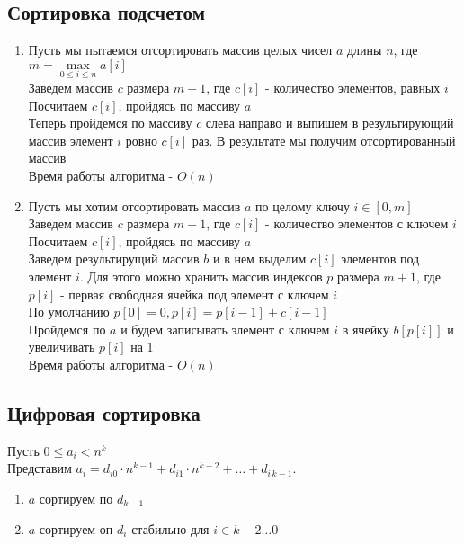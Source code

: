 \documentclass[12pt]{article}
\begin{document}
\subsection{Сортировка подсчетом}
\begin{enumerate}
    \item Пусть мы пытаемся отсортировать массив целых чисел $a$ длины $n$, где $m=\max\limits_{0\leq i\leq n} a[i]$\\
    Заведем массив $c$ размера $m+1$, где $c[i]$ - количество элементов, равных $i$\\
    Посчитаем $c[i]$, пройдясь по массиву $a$\\
    Теперь пройдемся по массиву $c$ слева направо и выпишем в результирующий массив элемент $i$ ровно $c[i]$ раз. В результате мы получим отсортированный массив\\
    Время работы алгоритма - $O(n)$
    \item Пусть мы хотим отсортировать массив $a$ по целому ключу $i \in [0, m]$\\
    Заведем массив $c$ размера $m+1$, где $c[i]$ - количество элементов с ключем $i$\\
    Посчитаем $c[i]$, пройдясь по массиву $a$\\
    Заведем результирущий массив $b$ и в нем выделим $c[i]$ элементов под элемент $i$. Для этого можно хранить массив индексов $p$ размера $m+1$, где $p[i]$ - первая свободная ячейка под элемент с ключем $i$\\
    По умолчанию $p[0] = 0, p[i] = p[i-1]+c[i-1]$\\
    Пройдемся по $a$ и будем записывать элемент с ключем $i$ в ячейку $b[p[i]]$ и увеличивать $p[i]$ на 1\\
    Время работы алгоритма - $O(n)$
\end{enumerate}
\subsection{Цифровая сортировка}
Пусть $0 \leq a_i < n^k$\\
Представим $a_i=d_{i0}\cdot n^{k-1} + d_{i1}\cdot n^{k-2} + \ldots + d_{i\,k-1}$.
\begin{enumerate}
    \item $a$ сортируем по $d_{k-1}$
    \item $a$ сортируем оп $d_i$ стабильно для $i \in k-2\ldots0$
\end{enumerate}
\end{document}
